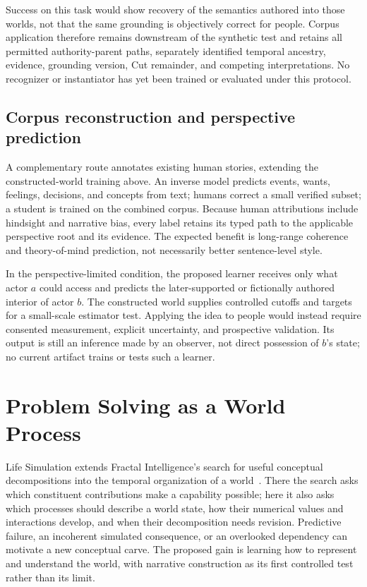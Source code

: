 \documentclass[10pt]{article}
\begin{document}
Success on this task would show recovery of the semantics authored into those
worlds, not that the same grounding is objectively correct for people. Corpus
application therefore remains downstream of the synthetic test and retains all
permitted authority-parent paths, separately identified temporal ancestry,
evidence, grounding version, Cut
remainder, and competing
interpretations. No recognizer or instantiator has yet been trained or
evaluated under this protocol.

\subsection{Corpus reconstruction and perspective prediction}
\label{sec:corpus-interior-learning}

A complementary route annotates existing human stories, extending the
constructed-world training above. An inverse model
predicts events, wants, feelings, decisions, and concepts from text; humans
correct a small verified subset; a student is trained on the combined corpus.
Because human attributions include hindsight and narrative bias, every label
retains its typed path to the applicable perspective root and its evidence. The expected benefit is long-range
coherence and theory-of-mind prediction, not necessarily better sentence-level
style.

In the perspective-limited condition, the proposed learner receives only what
actor $a$ could access and
predicts the later-supported or fictionally authored interior of actor $b$.
The constructed world supplies controlled cutoffs and targets for a small-scale
estimator test. Applying the idea to people would instead require consented
measurement, explicit uncertainty, and prospective validation. Its output is
still an inference made by an observer, not direct possession of $b$'s state;
no current artifact trains or tests such a learner.

\section{Problem Solving as a World Process}
\label{sec:problem-solving-events}

Life Simulation extends Fractal Intelligence's search for useful conceptual decompositions
into the temporal organization of a world~\cite{westerbergFractal2026}.
There the search asks which constituent contributions make a capability
possible; here it also asks which processes should describe a world state,
how their numerical values and interactions develop, and when their
decomposition needs revision. Predictive failure, an incoherent simulated
consequence, or an overlooked dependency can motivate a new conceptual carve.
The proposed gain is learning how to represent and understand the world,
with narrative construction as its first controlled test rather than its limit.
\end{document}
